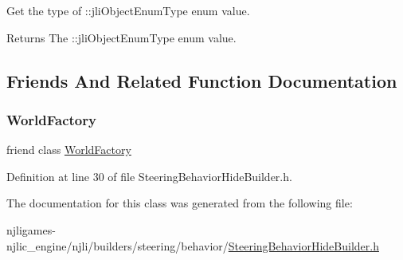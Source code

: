 Get the type of \+::jli\+Object\+Enum\+Type enum value.

\begin{DoxyReturn}{Returns}
The \+::jli\+Object\+Enum\+Type enum value. 
\end{DoxyReturn}


\subsection{Friends And Related Function Documentation}
\mbox{\label{classnjli_1_1_steering_behavior_hide_builder_acb96ebb09abe8f2a37a915a842babfac}} 
\subsubsection{\texorpdfstring{World\+Factory}{WorldFactory}}
{\footnotesize\ttfamily friend class \mbox{\hyperlink{classnjli_1_1_world_factory}{World\+Factory}}\hspace{0.3cm}{\ttfamily [friend]}}



Definition at line 30 of file Steering\+Behavior\+Hide\+Builder.\+h.



The documentation for this class was generated from the following file\+:\begin{DoxyCompactItemize}
\item 
njligames-\/njlic\+\_\+engine/njli/builders/steering/behavior/\mbox{\hyperlink{_steering_behavior_hide_builder_8h}{Steering\+Behavior\+Hide\+Builder.\+h}}\end{DoxyCompactItemize}
